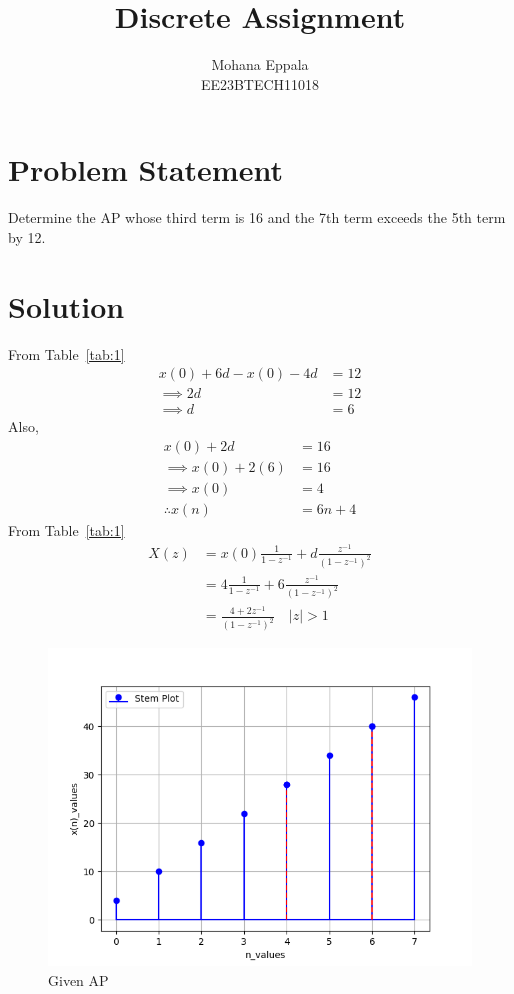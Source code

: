 \documentclass[12pt]{article}
\newcommand{\tabref}[1]{Table~\ref{#1}}
\providecommand{\abs}[1]{\left\vert#1\right\vert}
\begin{document}
\title{Discrete Assignment}
\author{Mohana Eppala\\ EE23BTECH11018}
\maketitle

\section*{Problem Statement}
Determine the AP whose third term is 16 and the 7th term exceeds the 5th term by 12. 
\section*{Solution}
\begin{table}[H]

\end{table}


From \tabref{tab:1}
\begin{align}
    x(0) +6d - x(0) - 4d &= 12 \\ \implies
    2d &= 12\\ \implies
    d &= 6
\end{align}
Also,
\begin{align}
     x(0) + 2d &= 16 \\ \implies
	x(0) + 2(6) &= 16 \\ \implies
	x(0) &= 4 \\
	\therefore x(n) &= 6n + 4 
\end{align}
From \tabref{tab:1}
\begin{align}
	X(z) &= x(0)  \frac{1}{1-z^{-1}} + d \frac{z^{-1}}{(1 - z^{-1})^2} \\
	&= 4 \frac{1}{1-z^{-1}} + 6 \frac{z^{-1}}{(1 - z^{-1})^2} \\
	&= \frac{4+2z^{-1}}{(1-z^{-1})^2} \quad \abs{z} > 1
\end{align}



\begin{figure}[H]
    \centering
    \includegraphics{figs/fig1.png}
    \caption{Given AP}
    \label{fig}
\end{figure}
\end{document}
